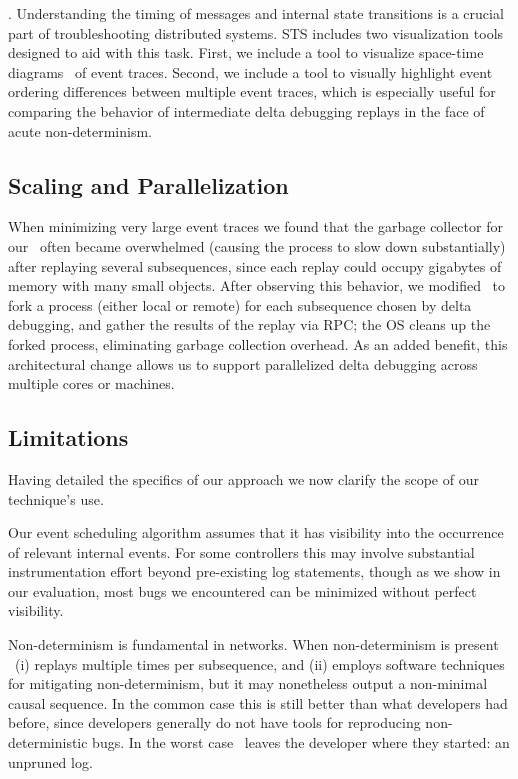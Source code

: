 . Understanding the timing of messages and internal
state transitions is a crucial part of troubleshooting distributed systems.
STS includes two visualization tools designed to aid with this task. First, we
include a tool to visualize space-time diagrams~\cite{Lamport:1978:TCO:359545.359563}
of event traces.
Second, we include a tool to visually highlight event ordering differences
between multiple event traces, which is especially useful for comparing the behavior of
intermediate delta debugging replays in the face of acute non-determinism.

\subsection{Scaling and Parallelization}
When minimizing very large event traces we found that the garbage collector
for our \tester~often became overwhelmed (causing the process to slow down
substantially) after replaying several subsequences, since each replay could
occupy gigabytes of memory with many small objects.
After observing this behavior, we modified \projectname~to fork a process
(either local or remote) for each subsequence chosen by delta debugging,
and gather the results of the replay via RPC; the OS cleans up the forked process,
eliminating garbage collection overhead.
As an added benefit, this architectural change allows us to support
parallelized delta debugging across multiple cores or machines.

\subsection{Limitations}
\label{subsec:non_goals}

Having detailed the specifics of our approach we now
clarify the scope of our technique's use.

 Our event scheduling algorithm assumes that
it has visibility into the occurrence of relevant internal events. For
some controllers this may involve substantial instrumentation effort beyond
pre-existing log statements, though as we show in our evaluation, most bugs
we encountered can be minimized without perfect visibility.

 Non-determinism
is fundamental in networks. When non-determinism is present
\projectname~(i) replays multiple times per subsequence, and (ii) employs
software techniques for mitigating non-determinism, but it may nonetheless
output a non-minimal causal sequence. In the common case this is still
better than what developers had before, since developers generally
do not have tools for reproducing non-deterministic bugs.
In the worst case \projectname~leaves the
developer where they started: an unpruned log.

